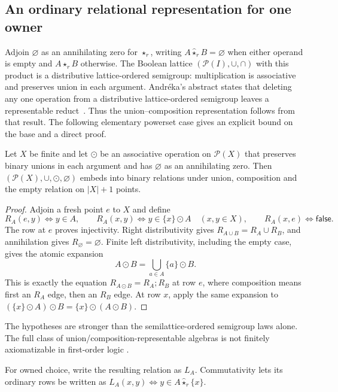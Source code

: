 \subsection{An ordinary relational representation for one owner}

Adjoin $\varnothing$ as an annihilating zero for $\star_r$, writing
$A\mathbin{\widehat\star_r}B=\varnothing$ when either operand is empty
and $A\star_r B$ otherwise. The Boolean lattice
$(\mathcal P(I),\cup,\cap)$ with this product is a distributive
lattice-ordered semigroup: multiplication is associative and preserves
union in each argument. Andr\'eka's abstract states that deleting any
one operation from a distributive lattice-ordered semigroup leaves a
representable reduct~\cite[abstract]{Andreka1991}. Thus the
union--composition representation follows from that result. The
following elementary powerset case gives an explicit bound on the base
and a direct proof.

\begin{lemma}\label{query:lem:powerset}
Let $X$ be finite and let $\odot$ be an associative operation on
$\mathcal P(X)$ that preserves binary unions in each argument and has
$\varnothing$ as an annihilating zero. Then
$(\mathcal P(X),\cup,\odot,\varnothing)$ embeds into binary relations
under union, composition and the empty relation on $|X|+1$ points.
\end{lemma}
\begin{proof}
Adjoin a fresh point $e$ to $X$ and define
\[
 R_A(e,y)\iff y\in A,\qquad
 R_A(x,y)\iff y\in\{x\}\odot A\quad(x,y\in X),
 \qquad R_A(x,e)\iff\mathsf{false}.
\]
The row at $e$ proves injectivity. Right distributivity gives
$R_{A\cup B}=R_A\cup R_B$, and annihilation gives
$R_\varnothing=\varnothing$. Finite left distributivity, including the
empty case, gives the atomic expansion
\[
 A\odot B=\bigcup_{a\in A}\{a\}\odot B.
\]
This is exactly the equation $R_{A\odot B}=R_A;R_B$ at row $e$, where
composition means first an $R_A$ edge, then an $R_B$ edge. At row $x$,
apply the same expansion to
$(\{x\}\odot A)\odot B=\{x\}\odot(A\odot B)$.
\end{proof}

The hypotheses are stronger than the semilattice-ordered semigroup
laws alone. The full class of union/composition-representable algebras
is not finitely axiomatizable in first-order logic
\cite[Section~3, Theorem~3.1]{AndrekaMikulas2011}.

For owned choice, write the resulting relation as $L_A$. Commutativity
lets its ordinary rows be written as
$L_A(x,y)\iff y\in A\mathbin{\widehat\star_r}\{x\}$.

